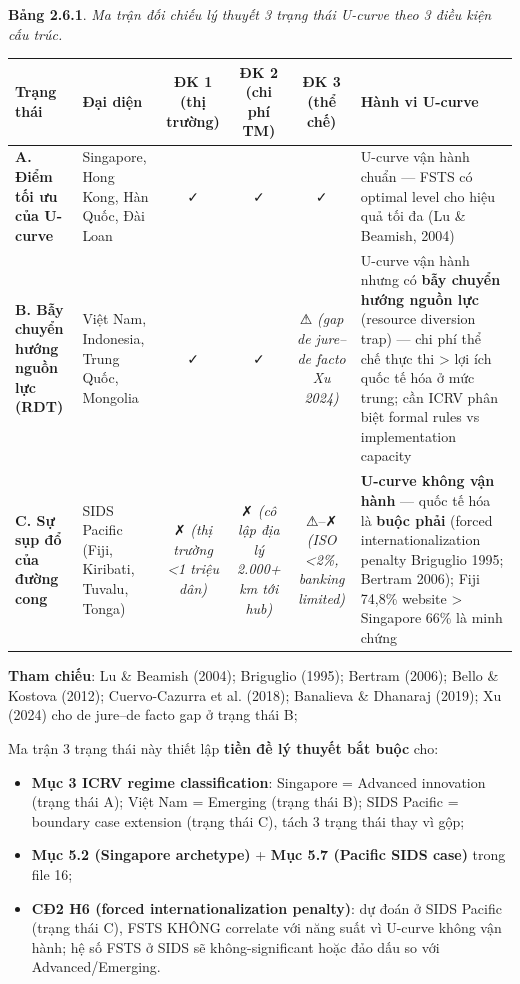 \documentclass[12pt,a4paper]{article}
\providecommand{\tightlist}{\setlength{\itemsep}{0pt}\setlength{\parskip}{0pt}}
\begin{document}
\textbf{Bảng 2.6.1}. \emph{Ma trận đối chiếu lý thuyết 3 trạng thái
U-curve theo 3 điều kiện cấu trúc.}

\begin{longtable}[]{@{}llcccl@{}}
\toprule\noalign{}
Trạng thái & Đại diện & ĐK 1 (thị trường) & ĐK 2 (chi phí TM) & ĐK 3
(thể chế) & Hành vi U-curve \\
\midrule\noalign{}
\endhead
\bottomrule\noalign{}
\endlastfoot
\textbf{A. Điểm tối ưu của U-curve} & Singapore, Hong Kong, Hàn Quốc,
Đài Loan & ✓ & ✓ & ✓ & U-curve vận hành chuẩn --- FSTS có optimal level
cho hiệu quả tối đa (Lu \& Beamish, 2004) \\
\textbf{B. Bẫy chuyển hướng nguồn lực (RDT)} & Việt Nam, Indonesia,
Trung Quốc, Mongolia & ✓ & ✓ & ⚠ \emph{(gap de jure--de facto Xu 2024)}
& U-curve vận hành nhưng có \textbf{bẫy chuyển hướng nguồn lực}
(resource diversion trap) --- chi phí thể chế thực thi \textgreater{}
lợi ích quốc tế hóa ở mức trung; cần ICRV phân biệt formal rules vs
implementation capacity \\
\textbf{C. Sự sụp đổ của đường cong} & SIDS Pacific (Fiji, Kiribati,
Tuvalu, Tonga) & ✗ \emph{(thị trường \textless1 triệu dân)} & ✗
\emph{(cô lập địa lý 2.000+ km tới hub)} & ⚠--✗ \emph{(ISO \textless2\%,
banking limited)} & \textbf{U-curve không vận hành} --- quốc tế hóa là
\textbf{buộc phải} (forced internationalization penalty Briguglio 1995;
Bertram 2006); Fiji 74,8\% website \textgreater{} Singapore 66\% là minh
chứng \\
\end{longtable}

\textbf{Tham chiếu}: Lu \& Beamish (2004); Briguglio (1995); Bertram
(2006); Bello \& Kostova (2012); Cuervo-Cazurra et al. (2018); Banalieva
\& Dhanaraj (2019); Xu (2024) cho de jure--de facto gap ở trạng thái B;

Ma trận 3 trạng thái này thiết lập \textbf{tiền đề lý thuyết bắt buộc}
cho:

\begin{itemize}
\tightlist
\item
  \textbf{Mục 3 ICRV regime classification}: Singapore = Advanced
  innovation (trạng thái A); Việt Nam = Emerging (trạng thái B); SIDS
  Pacific = boundary case extension (trạng thái C), tách 3 trạng thái
  thay vì gộp;
\item
  \textbf{Mục 5.2 (Singapore archetype)} + \textbf{Mục 5.7 (Pacific SIDS
  case)} trong file 16;
\item
  \textbf{CĐ2 H6 (forced internationalization penalty)}: dự đoán ở SIDS
  Pacific (trạng thái C), FSTS KHÔNG correlate với năng suất vì U-curve
  không vận hành; hệ số FSTS ở SIDS sẽ không-significant hoặc đảo dấu so
  với Advanced/Emerging.
\end{itemize}
\end{document}
